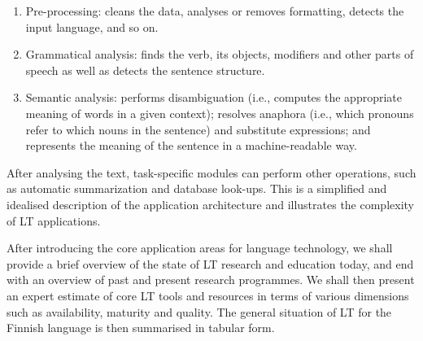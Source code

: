 \documentclass{../../metanetpaper}
\begin{document}
\begin{Parallel}[c]{79mm}{78mm}
{\begin{enumerate}
\item Pre-processing: cleans the data, analyses or removes formatting,
detects the input language, and so on.

\item Grammatical analysis: finds the verb, its objects, modifiers and
other parts of speech as well as detects the sentence structure.

\item Semantic analysis: performs disambiguation (i.e., computes the
appropriate meaning of words in a given context); resolves anaphora
(i.e., which pronouns refer to which nouns in the sentence) and
substitute expressions; and represents the meaning of the sentence in
a machine-readable way.
\end{enumerate}
After analysing the text, task-specific modules can perform other
operations, such as automatic summarization and database
look-ups. This is a simplified and idealised description of the
application architecture and illustrates the complexity of LT
applications.

After introducing the core application areas for language technology,
we shall provide a brief overview of the state of LT research and
education today, and end with an overview of past and present research
programmes. We shall then present an expert estimate of core LT tools
and resources in terms of various dimensions such as availability,
maturity and quality. The general situation of LT for the Finnish
language is then summarised in tabular form.
}

\ParallelPar




\ParallelPar



\end{Parallel}
\end{document}

